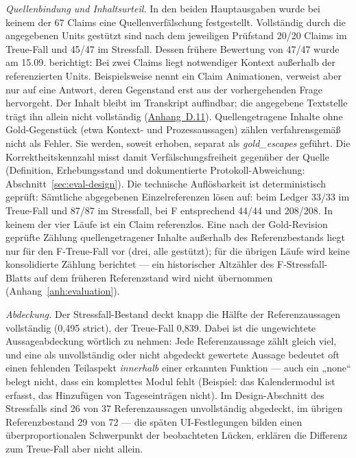 \emph{Quellenbindung und Inhaltsurteil.} In den beiden
Hauptausgaben wurde bei keinem der 67 Claims eine Quellenverfälschung
festgestellt. Vollständig durch die angegebenen Units gestützt sind
nach dem jeweiligen Prüfstand 20/20 Claims im Treue-Fall und 45/47
im Stressfall. Dessen frühere Bewertung von 47/47 wurde am 15.09.
berichtigt: Bei zwei Claims liegt notwendiger Kontext außerhalb
der referenzierten Units. Beispielsweise nennt ein Claim Animationen,
verweist aber nur auf eine Antwort, deren Gegenstand erst aus der
vorhergehenden Frage hervorgeht. Der Inhalt bleibt im Transkript
auffindbar; die angegebene Textstelle trägt ihn allein nicht
vollständig (\hyperref[anh:ledger-wiederholungen]{Anhang~D.11}).
Quellengetragene Inhalte ohne Gold-Gegenstück (etwa Kontext- und
Prozessaussagen) zählen verfahrensgemäß nicht als Fehler. Sie werden, soweit
erhoben, separat als \emph{gold\_escapes} geführt. Die Korrektheitskennzahl
misst damit Verfälschungsfreiheit gegenüber der Quelle (Definition,
Erhebungsstand und dokumentierte Protokoll-Abweichung:
Abschnitt~\ref{sec:eval-design}). Die
technische Auflösbarkeit ist deterministisch geprüft: Sämtliche abgegebenen
Einzelreferenzen lösen auf: beim Ledger 33/33 im Treue-Fall und
87/87 im Stressfall, bei F entsprechend 44/44 und 208/208.
In keinem der vier Läufe ist ein Claim referenzlos.
Eine nach der Gold-Revision geprüfte Zählung quellengetragener
Inhalte außerhalb des Referenzbestands liegt nur für den
F-Treue-Fall vor (drei, alle gestützt); für die übrigen Läufe
wird keine konsolidierte Zählung berichtet --- ein historischer
Altzähler des F-Stressfall-Blatts auf dem früheren Referenzstand
wird nicht übernommen (Anhang~\ref{anh:evaluation}).

\emph{Abdeckung.} Der Stressfall-Bestand deckt knapp die Hälfte der
Referenzaussagen vollständig (0{,}495 strict), der Treue-Fall
0{,}839. Dabei ist die ungewichtete Aussageabdeckung wörtlich zu
nehmen: Jede Referenzaussage zählt gleich viel, und eine als
unvollständig oder nicht abgedeckt gewertete Aussage bedeutet oft
einen fehlenden Teilaspekt \emph{innerhalb} einer erkannten
Funktion --- auch ein „none`` belegt nicht, dass ein komplettes
Modul fehlt (Beispiel: das Kalendermodul ist erfasst, das
Hinzufügen von Tageseinträgen nicht). Im Design-Abschnitt des
Stressfalls sind 26 von 37 Referenzaussagen unvollständig
abgedeckt, im übrigen Referenzbestand 29 von 72 --- die späten
UI-Festlegungen bilden einen überproportionalen Schwerpunkt der
beobachteten Lücken, erklären die Differenz zum Treue-Fall aber
nicht allein.

